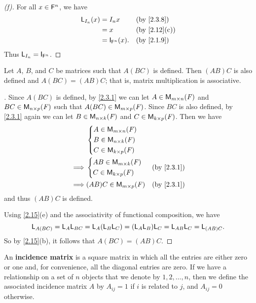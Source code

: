 \begin{proof}[(f)]
	For all \(x \in \mathsf{F}^n\), we have
	\begin{align*}
		\L_{I_n}(x) & = I_n x              &  & \by{2.3.8}   \\
		            & = x                  &  & \by{2.12}[c] \\
		            & = \IT_{\vs{F}^n}(x). &  & \by{2.1.9}
	\end{align*}
	Thus \(\L_{I_n} = \IT_{\vs{F}^n}\).
\end{proof}

\begin{thm}\label{2.16}
	Let \(A\), \(B\), and \(C\) be matrices such that \(A (BC)\) is defined.
	Then \((AB) C\) is also defined and \(A (BC) = (AB) C\);
	that is, matrix multiplication is associative.
\end{thm}

\begin{proof}[]
	Since \(A (BC)\) is defined, by \cref{2.3.1} we can let \(A \in \mathsf{M}_{{m} \times n}({\mathit{F}})\) and \(BC \in \mathsf{M}_{{n} \times p}({\mathit{F}})\) such that \(A (BC) \in \mathsf{M}_{{m} \times p}({\mathit{F}})\).
	Since \(BC\) is also defined, by \cref{2.3.1} again we can let \(B \in \mathsf{M}_{{n} \times k}({\mathit{F}})\) and \(C \in \mathsf{M}_{{k} \times p}({\mathit{F}})\).
	Then we have
	\begin{align*}
		         & \begin{dcases}
			           A \in \MS           \\
			           B \in \ms{n}{k}{\F} \\
			           C \in \ms{k}{p}{\F}
		           \end{dcases}                      \\
		\implies & \begin{dcases}
			           AB \in \ms{m}{k}{\F} \\
			           C \in \ms{k}{p}{\F}
		           \end{dcases}  &  & \by{2.3.1}            \\
		\implies & (AB) C \in \ms{m}{p}{\F} &  & \by{2.3.1}
	\end{align*}
	and thus \((AB) C\) is defined.

	Using \cref{2.15}(e) and the associativity of functional composition, we have
	\[
		\mathsf{L}_{A (BC)} = \mathsf{L}_A \mathsf{L}_{BC} = \mathsf{L}_A (\mathsf{L}_B \mathsf{L}_C) = (\mathsf{L}_A \mathsf{L}_B) \mathsf{L}_C = \mathsf{L}_{AB} \mathsf{L}_C = \mathsf{L}_{(AB) C}.
	\]
	So by \cref{2.15}(b), it follows that \(A (BC) = (AB) C\).
\end{proof}

\begin{defn}\label{2.3.9}
	An \textbf{incidence matrix} is a square matrix in which all the entries are either zero or one and, for convenience, all the diagonal entries are zero.
	If we have a relationship on a set of \(n\) objects that we denote by \(1, 2, \dots, n\), then we define the associated incidence matrix \(A\) by \(A_{i j} = 1\) if \(i\) is related to \(j\), and \(A_{i j} = 0\) otherwise.
\end{defn}

